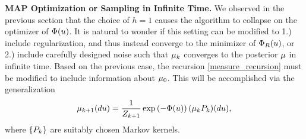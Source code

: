 \documentclass[12pt]{article}
\begin{document}
\bigskip
\noindent
\textbf{MAP Optimization or Sampling in Infinite Time.} We observed in the previous section that the choice of $h = 1$ causes the algorithm 
to collapse on the optimizer of $\Phi(u)$. It is natural to wonder if this setting can be modified to 1.) include regularization, and thus 
instead converge to the minimizer of $\Phi_R(u)$, or 2.) include carefully designed noise such that $\mu_{k}$ converges
to the posterior $\mu$ in infinite time. Based on the previous case, the recursion \ref{measure_recursion} must be modified to include 
information about $\mu_0$. This will be accomplished via the generalization 
\begin{align} 
\mu_{k+1}(du) = \frac{1}{Z_{k+1}} \exp\left(-\Phi(u) \right) (\mu_{k} P_{k})(du) \label{measure_recursion_regularized},
\end{align}
where $\{P_{k}\}$ are suitably chosen Markov kernels. 
\end{document}

